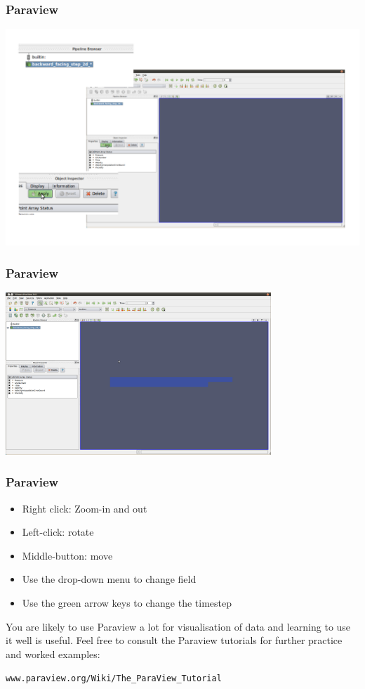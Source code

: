 \documentclass[12pt]{beamer}
\begin{document}
\begin{frame}
    \frametitle{Paraview}
\begin{center}
\includegraphics[width=\textwidth]{images/paraview_after_open.png}
\end{center}
\end{frame}
\begin{frame}
    \frametitle{Paraview}
\begin{center}
\includegraphics[width=0.75\textwidth]{images/paraview_after_loading.png}
\end{center}
\end{frame}
\begin{frame}
    \frametitle{Paraview}
\begin{itemize}
\item Right click: Zoom-in and out
\item Left-click: rotate
\item Middle-button: move
\item Use the drop-down menu to change field
\item Use the green arrow keys to change the timestep
\end{itemize}
You are likely to use Paraview a lot for visualisation of data
and learning to use it well is useful. Feel free to consult the Paraview
tutorials for further practice and worked examples:\\
\begin{center}
 {\tt www.paraview.org/Wiki/The\_ParaView\_Tutorial}
\end{center}

\end{frame}
\end{document}
